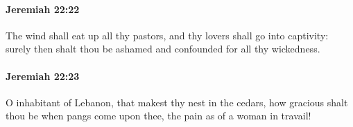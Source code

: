 		\paragraph{Jeremiah 22:22} %
			\label{JEREMIAH-22-22}

			The wind shall eat up all thy pastors, and thy lovers shall go into captivity: surely then shalt thou be ashamed and confounded for all thy wickedness.


		\paragraph{Jeremiah 22:23} %
			\label{JEREMIAH-22-23}

			O inhabitant of Lebanon, that makest thy nest in the cedars, how gracious shalt thou be when pangs come upon thee, the pain as of a woman in travail!



